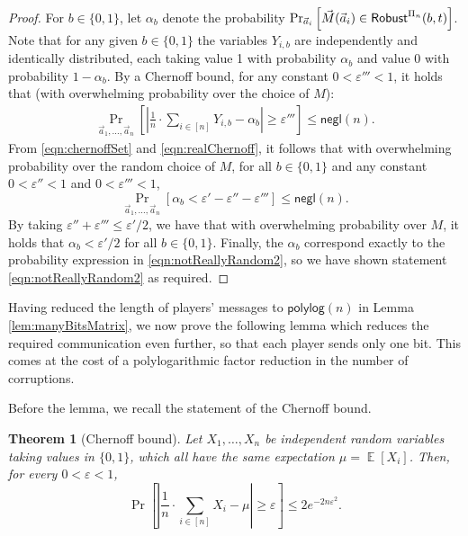 \documentclass[11pt,letterpaper]{article}
\theoremstyle{plain}
\newtheorem{theorem}{Theorem}[section]
\theoremstyle{definition}
\newcommand{\EE}{\mathop{{}\mathbb{E}}}
\newcommand{\eps}{\varepsilon}
\newcommand{\negl}{\mathsf{negl}}
\newcommand{\polylog}{\mathsf{polylog}}
\begin{document}
\begin{proof}
For $b\in\{0,1\}$, let $\alpha_b$ denote the probability $\Pr_{\vec{a}_i}\left[\vec{M}(\vec{a}_i)\in{\sf Robust}^{\Pi_n}(b,t)\right]$.
Note that for any given $b\in\{0,1\}$ the variables $Y_{i,b}$ are independently and identically distributed, each taking value 1 with probability $\alpha_b$
and value 0 with probability $1-\alpha_b$. 
By a Chernoff bound, for any constant $0<\eps'''<1$, it holds that (with overwhelming probability over the choice of $M$):
\begin{align}\label{eqn:realChernoff}
\Pr_{\vec{a}_1,\dots,\vec{a}_n}\left[\left|\frac{1}{n}\cdot\sum_{i\in[n]}Y_{i,b}-\alpha_b\right|\geq\eps'''\right]\leq\negl(n).
\end{align}
From \eqref{eqn:chernoffSet} and \eqref{eqn:realChernoff}, it follows that with overwhelming probability over the random choice of $M$, 
for all $b\in\{0,1\}$ and any constant $0<\eps''<1$ and $0<\eps'''<1$,
$$
\Pr_{\vec{a}_1,\dots,\vec{a}_n}\left[\alpha_b<\eps'-\eps''-\eps'''\right]\leq\negl(n).
$$
By taking $\eps''+\eps'''\leq\eps'/2$, we have that with overwhelming probability over $M$, it holds that $\alpha_b<\eps'/2$ for all $b\in\{0,1\}$.
Finally, the $\alpha_b$ correspond exactly to the probability expression in \eqref{eqn:notReallyRandom2}, so
we have shown statement \eqref{eqn:notReallyRandom2} as required.
\end{proof}


Having reduced the length of players' messages to $\polylog(n)$ in Lemma \ref{lem:manyBitsMatrix},
we now prove the following lemma which reduces the required communication even further, so that each player sends only one bit.
This comes at the cost of a polylogarithmic factor reduction in the number of corruptions.

Before the lemma, we recall the statement of the Chernoff bound.

\begin{theorem}[Chernoff bound]
Let $X_1,\dots,X_n$ be independent random variables taking values in $\{0,1\}$, which all have the same expectation $\mu=\EE[X_i]$. Then, for every $0<\eps<1$,
$$\Pr\left[\left|\frac{1}{n}\cdot\sum_{i\in[n]} X_i-\mu\right|\geq\eps\right]\leq 2e^{-2n\eps^2}.$$
\end{theorem}
\end{document}

